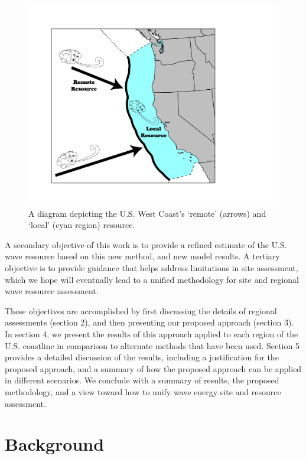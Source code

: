 \documentclass[authoryear,preprint]{elsarticle}
\begin{document}
\begin{figure}[ht]
  \centering
\includegraphics[width=0.9\linewidth]{../diagram/EEZ_contour03_edit01.png}
  \caption{A diagram depicting the U.S. West Coast’s ‘remote’ (arrows) and ‘local’ (cyan region) resource.}
  \label{fig:map01}
\end{figure}

A secondary objective of this work is to provide a refined estimate of the U.S. wave resource based on this new method, and new model results. A tertiary objective is to provide guidance that helps address limitations in site assessment, which we hope will eventually lead to a unified methodology for site and regional wave resource assessment.

These objectives are accomplished by first discussing the details of regional assessments (section 2), and then presenting our proposed approach (section 3). In section 4, we present the results of this approach applied to each region of the U.S. coastline in comparison to alternate methods that have been used. Section 5 provides a detailed discussion of the results, including a justification for the proposed approach, and a summary of how the proposed approach can be applied in different scenarios. We conclude with a summary of results, the proposed methodology, and a view toward how to unify wave energy site and resource assessment.

\section{Background}
\end{document}
